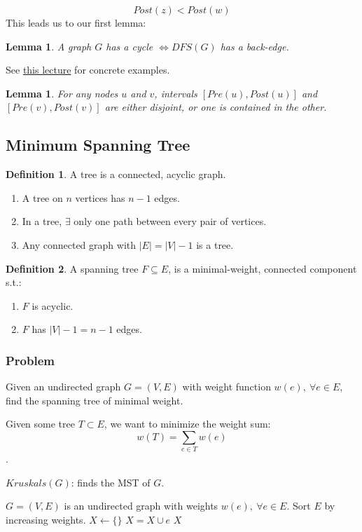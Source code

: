 \documentclass{article}
\newtheorem{lemma}[theorem]{Lemma}
\theoremstyle{definition}
\newtheorem{definition}{Definition}[section]
\begin{document}
$$Post(z) < Post(w)$$ This leads us to our first lemma:
\begin{lemma}
\label{cycle}
	A graph $G$ has a cycle $\iff DFS(G)$ has a back-edge.
\end{lemma}

See \href{https://classroom.udacity.com/courses/ud401/lessons/10159691481/concepts/101975518340923}{this lecture} for concrete examples. 

\begin{lemma}
\label{containment}
For any nodes $u$ and $v$, intervals $[ Pre(u), Post(u) ]$ and $[Pre(v), Post(v)]$ are either disjoint, or one is contained in the other.
\end{lemma}

\subsection{Minimum Spanning Tree}
\begin{definition}
	A tree is a connected, acyclic graph.
	\begin{enumerate}
		\item A tree on $n$ vertices has $n-1$ edges.
		\item In a tree, $\exists$ only one path between every pair of vertices.
		\item Any connected graph with $|E|=|V|-1$ is a tree.
	\end{enumerate}
\end{definition}

\begin{definition}
A spanning tree $F \subseteq E$, is a minimal-weight, connected component s.t.:
\begin{enumerate}
	\item $F$ is acyclic. 
	\item $F$ has $|V|-1=n-1$ edges.
\end{enumerate}
\end{definition}

\subsubsection{Problem}
Given an undirected graph $G = (V,E)$ with weight function $w(e),\: \forall e \in E$, find the spanning tree of minimal weight. 

Given some tree $T \subset E$, we want to minimize the weight sum: $$w(T) = \sum_{e \in T}w(e)$$.

\begin{algorithm}
	\caption{$Kruskals(G)$: finds the MST of $G$.}
	\label{alg:kruskals}
	\begin{algorithmic}[1]
		\REQUIRE $G=(V,E)$ is an undirected graph with weights $w(e), \: \forall e \in E$.
		\STATE Sort $E$ by increasing weights. 
		\STATE $X \gets \{\}$
			\STATE $X = X \cup e$
		\ENDIF
		\ENDFOR
		\RETURN $X$
	\end{algorithmic}
\end{algorithm}
\end{document}
